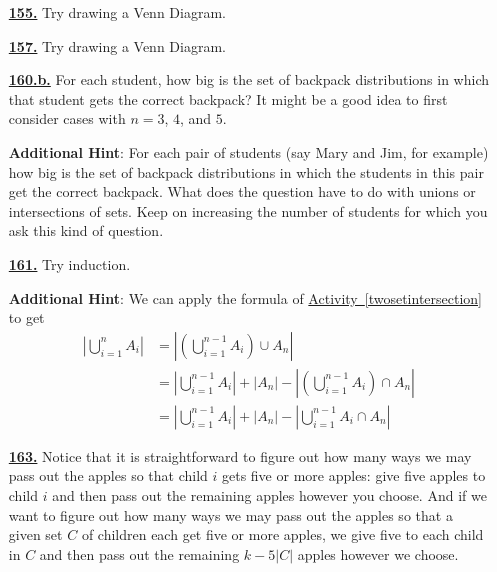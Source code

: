 \documentclass[10pt,]{book}
\theoremstyle{plain}
\theoremstyle{definition}
\theoremstyle{definition}
\theoremstyle{definition}
\numberwithin{equation}{chapter}
\newcommand{\amp}{&}
\begin{document}
\begin{itemize}[itemsep=1em]
\hypertarget{a-155}{}\item[\textbf{\hyperref[twosetintersection]{155.}}]
\hypertarget{p-753}{}%
Try drawing a Venn Diagram.%

\hypertarget{a-157}{}\item[\textbf{\hyperref[threesetintersection]{157.}}]
\hypertarget{p-759}{}%
Try drawing a Venn Diagram.%

\hypertarget{a-160.b}{}\item[\textbf{\hyperref[task-157]{160.b.}}]
\hypertarget{p-771}{}%
For each student, how big is the set of backpack distributions in which that student gets the correct backpack?  It might be a good idea to first consider cases with \(n=3\), \(4\), and \(5\).%

\par\smallskip
\noindent\textbf{Additional Hint}: \hypertarget{p-772}{}%
For each pair of students (say Mary and Jim, for example) how big is the set of backpack distributions in which the students in this pair get the correct backpack. What does the question have to do with unions or intersections of sets. Keep on increasing the number of students for which you ask this kind of question.%

\hypertarget{a-161}{}\item[\textbf{\hyperref[activity-161]{161.}}]
\hypertarget{p-783}{}%
Try induction.%

\par\smallskip
\noindent\textbf{Additional Hint}: \hypertarget{p-784}{}%
We can apply the formula of \hyperref[twosetintersection]{Activity~\ref{twosetintersection}} to get%
\begin{align*}
\left|\bigcup_{i=1}^n A_i \right| \amp = \left|\left(\bigcup_{i=1}^{n-1} A_i\right) \cup A_n \right| \\
\amp = \left| \bigcup_{i=1}^{n-1} A_i\right| + |A_n| - \left|\left( \bigcup_{i=1}^{n-1} A_i\right) \cap A_n\right|\\
\amp = \left| \bigcup_{i=1}^{n-1} A_i\right| + |A_n| - \left|\bigcup_{i=1}^{n-1} A_i \cap A_n\right|
\end{align*}
%

\hypertarget{a-163}{}\item[\textbf{\hyperref[act_restrictedmultisetspie]{163.}}]
\hypertarget{p-790}{}%
Notice that it is straightforward to figure out how many ways we may pass out the apples so that child \(i\) gets five or more apples: give five apples to child \(i\) and then pass out the remaining apples however you choose. And if  we want to figure out how many ways we may pass out the apples so that a given set \(C\) of children each get five or more apples, we give five to each child in \(C\) and then pass out the remaining \(k-5|C|\) apples however we choose.%


\end{itemize}
\end{document}

